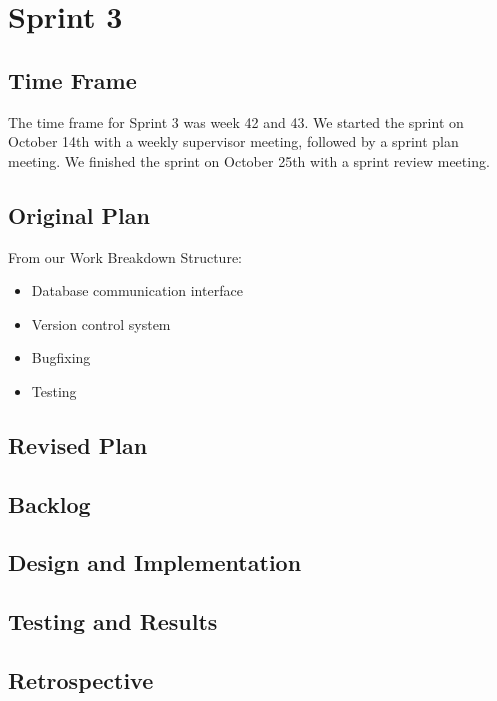 \section{Sprint 3}
\subsection{Time Frame}
The time frame for Sprint 3 was week 42 and 43. We started the sprint on October 14th with a weekly supervisor meeting, followed by a sprint plan meeting. We finished the sprint on October 25th with a sprint review meeting.
\subsection{Original Plan}
From our Work Breakdown Structure:
\begin{itemize}
	\item Database communication interface
	\item Version control system
	\item Bugfixing
	\item Testing
\end{itemize}
\subsection{Revised Plan}
\subsection{Backlog}
\subsection{Design and Implementation}
\subsection{Testing and Results}
\subsection{Retrospective}
